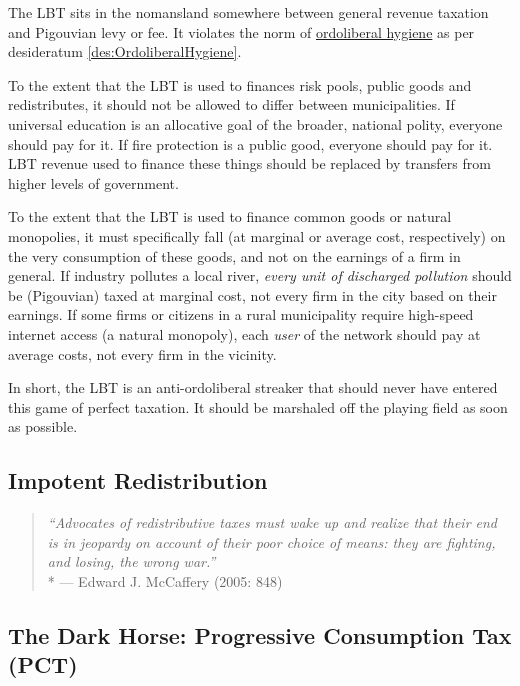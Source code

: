The LBT sits in the nomansland somewhere between general revenue taxation and Pigouvian levy or fee. It violates the norm of \hyperref[des:OrdoliberalHygiene]{ordoliberal hygiene} as per desideratum \ref{des:OrdoliberalHygiene}.

To the extent that the LBT is used to finances risk pools, public goods and redistributes, it should not be allowed to differ between municipalities. If universal education is an allocative goal of the broader, national polity, everyone should pay for it. If fire protection is a public good, everyone should pay for it. LBT revenue used to finance these things should be replaced by transfers from higher levels of government. %

To the extent that the LBT is used to finance common goods or natural monopolies, it must specifically fall (at marginal or average cost, respectively) on the very consumption of these goods, and not on the earnings of a firm in general. If industry pollutes a local river, \emph{every unit of discharged pollution} should be (Pigouvian) taxed at marginal cost, not every firm in the city based on their earnings. If some firms or citizens in a rural municipality require high-speed internet access (a natural monopoly), each \emph{user} of the network should pay at average costs, not every firm in the vicinity. %

In short, the LBT is an anti-ordoliberal streaker that should never have entered this game of perfect taxation. It should be marshaled off the playing field as soon as possible.

\subsection{Impotent Redistribution}

\begin{quote}
	\emph{``Advocates of redistributive taxes must wake up and realize that their end is in jeopardy on account of their poor choice of means: they are fighting, and losing, the wrong war.''}\\*
	--- Edward J. McCaffery (2005: 848)
\end{quote}


\subsection[Progressive Consumption Tax]{The Dark Horse: Progressive Consumption Tax (PCT)} \label{sec:ScorePCT} 

